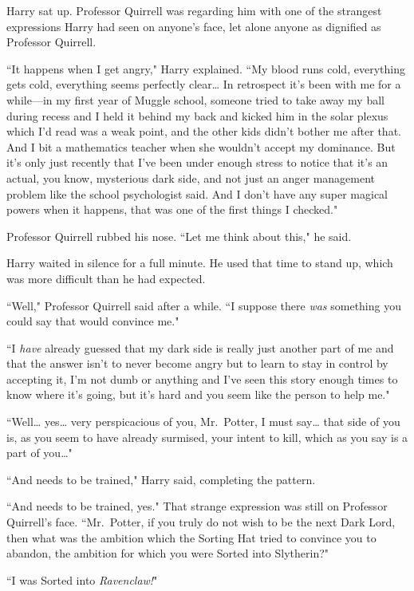 Harry sat up. Professor Quirrell was regarding him with one of the strangest expressions Harry had seen on anyone's face, let alone anyone as dignified as Professor Quirrell.

``It happens when I get angry," Harry explained. ``My blood runs cold, everything gets cold, everything seems perfectly clear{\ldots} In retrospect it's been with me for a while—in my first year of Muggle school, someone tried to take away my ball during recess and I held it behind my back and kicked him in the solar plexus which I'd read was a weak point, and the other kids didn't bother me after that. And I bit a mathematics teacher when she wouldn't accept my dominance. But it's only just recently that I've been under enough stress to notice that it's an actual, you know, mysterious dark side, and not just an anger management problem like the school psychologist said. And I don't have any super magical powers when it happens, that was one of the first things I checked."

Professor Quirrell rubbed his nose. ``Let me think about this," he said.

Harry waited in silence for a full minute. He used that time to stand up, which was more difficult than he had expected.

``Well," Professor Quirrell said after a while. ``I suppose there \emph{was} something you could say that would convince me."

``I \emph{have} already guessed that my dark side is really just another part of me and that the answer isn't to never become angry but to learn to stay in control by accepting it, I'm not dumb or anything and I've seen this story enough times to know where it's going, but it's hard and you seem like the person to help me."

``Well{\ldots} yes{\ldots} very perspicacious of you, Mr.~Potter, I must say{\ldots} that side of you is, as you seem to have already surmised, your intent to kill, which as you say is a part of you{\ldots}"

``And needs to be trained," Harry said, completing the pattern.

``And needs to be trained, yes." That strange expression was still on Professor Quirrell's face. ``Mr.~Potter, if you truly do not wish to be the next Dark Lord, then what was the ambition which the Sorting Hat tried to convince you to abandon, the ambition for which you were Sorted into Slytherin?"

``I was Sorted into \emph{Ravenclaw!}"

